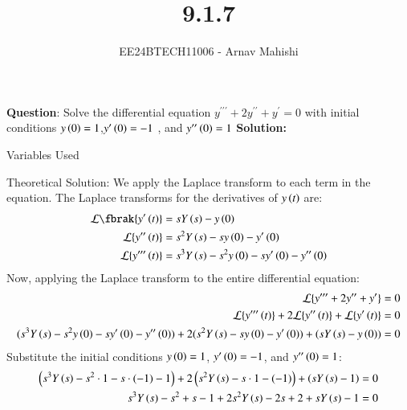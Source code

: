 \documentclass[journal]{IEEEtran}
\begin{document}

\vspace{3cm}

\title{9.1.7}
\author{EE24BTECH11006 - Arnav Mahishi}
{\let\newpage\relax\maketitle}

\renewcommand{\thefigure}{\theenumi}
\renewcommand{\thetable}{\theenumi}
\setlength{\intextsep}{10pt} %


\renewcommand{\thetable}{\theenumi}


\textbf{Question}:\newline
Solve the differential equation $y^{\prime\prime\prime}+2y^{\prime\prime}+y^{\prime} = 0$ with initial conditions $y\left(0\right) = 1$,$y^{\prime}\left(0\right) = -1$ , and $y^{\prime\prime}\left(0\right) = 1$
\newline
\textbf{Solution: }
\begin{table}[h!]    
  \centering
  
  \caption{Variables Used}
  \label{tab1.1.2.2}
\end{table}
\newline
Theoretical Solution:
We apply the Laplace transform to each term in the equation. The Laplace transforms for the derivatives of $y\left(t\right)$ are:
\begin{align}
\mathcal{L}\fbrak{y^{\prime}\brak{t}} &= sY\brak{s} - y\brak{0}\\
\mathcal{L}\{y^{\prime\prime}\brak{t}\} &= s^2Y\brak{s} - s y\brak{0} - y^{\prime}\brak{0}\\
\mathcal{L}\{y^{\prime\prime\prime}\brak{t}\} &= s^3Y\brak{s} - s^2 y\brak{0} - sy^{\prime}\brak{0} - y^{\prime\prime}\brak{0}
\end{align}
Now, applying the Laplace transform to the entire differential equation:
\begin{align}
\mathcal{L}\{y^{\prime\prime\prime} + 2y^{\prime\prime} + y^{\prime}\} = 0\\
\mathcal{L}\{y^{\prime\prime\prime}\left(t\right)\} + 2\mathcal{L}\{y^{\prime\prime}\left(t\right)\} + \mathcal{L}\{y^{\prime}\left(t\right)\} = 0 \\
(s^3 Y\left(s\right) - s^2 y\left(0\right) - s y^{\prime}\left(0\right) - y^{\prime\prime}\left(0\right)) + 2(s^2 Y\left(s\right) - s y\left(0\right) - y^{\prime}\left(0\right)) + (s Y\left(s\right) - y\left(0\right)) = 0
\end{align}
Substitute the initial conditions $y\left(0\right) = 1$, $y^{\prime}\left(0\right) = -1$, and $y^{\prime\prime}\left(0\right) = 1$:
\begin{align}
\left(s^3 Y\left(s\right) - s^2 \cdot 1 - s \cdot (-1) - 1\right) + 2\left(s^2 Y\left(s\right) - s \cdot 1 - (-1)\right) + \left(s Y\left(s\right) - 1\right) &= 0 \\
s^3 Y\left(s\right) - s^2 + s - 1 + 2s^2 Y\left(s\right) - 2s + 2 + s Y\left(s\right) - 1 &= 0
\end{align}
\end{document}
